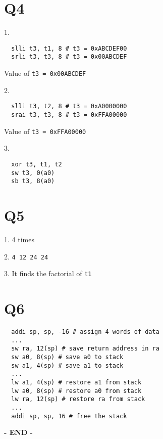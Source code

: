 \documentclass[12pt]{article}
\begin{document}
\section*{Q4}
1. 
\begin{verbatim}
  slli t3, t1, 8 # t3 = 0xABCDEF00
  srli t3, t3, 8 # t3 = 0x00ABCDEF
\end{verbatim}
\quad Value of \verb|t3 = 0x00ABCDEF|

2. 
\begin{verbatim}
  slli t3, t2, 8 # t3 = 0xA0000000
  srai t3, t3, 8 # t3 = 0xFFA00000
\end{verbatim}
\quad Value of \verb|t3 = 0xFFA00000|

3. 
\begin{verbatim}
  xor t3, t1, t2
  sw t3, 0(a0)
  sb t3, 8(a0)
\end{verbatim}

\section*{Q5}
1. 4 times

2. \verb|4 12 24 24|

3. It finds the factorial of \verb|t1|

\section*{Q6}
\begin{verbatim}
  addi sp, sp, -16 # assign 4 words of data
  ... 
  sw ra, 12(sp) # save return address in ra
  sw a0, 8(sp) # save a0 to stack
  sw a1, 4(sp) # save a1 to stack
  ... 
  lw a1, 4(sp) # restore a1 from stack
  lw a0, 8(sp) # restore a0 from stack
  lw ra, 12(sp) # restore ra from stack
  ...
  addi sp, sp, 16 # free the stack
\end{verbatim}

\vfill\centering\textbf{- END -}
\end{document}
